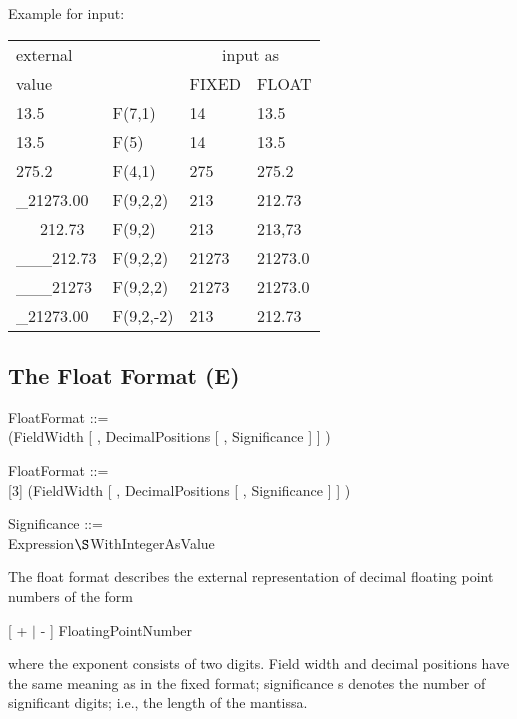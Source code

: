 \begin{added}
Example for input:

\begin{tabular}{llll}
external       &          & \multicolumn{2}{c}{input as}  \\ 
value       &          & FIXED & FLOAT  \\ \hline
13.5   & F(7,1)   &  14 & 13.5   \\
13.5   & F(5)     &  14 & 13.5   \\
275.2  & F(4,1)   & 275 & 275.2 \\
\_21273.00 & F(9,2,2) & 213 & 212.73 \\
\ \ \ 212.73 &  F(9,2)&  213 & 213,73 \\
\_\_\_212.73 & F(9,2,2) & 21273 & 21273.0 \\
\_\_\_21273 & F(9,2,2) & 21273 & 21273.0 \\
\_21273.00 & F(9,2,-2)   & 213 & 212.73 \\
\end{tabular}

\end{added}

\subsection{The Float Format (E)}   %
\label{sec_dation_e_format}

\begin{removed}
FloatFormat ::=\\
 (FieldWidth [ , DecimalPositions [ , Significance ] ] )
\end{removed}
\begin{added}
FloatFormat ::=\\
[3] (FieldWidth [ , DecimalPositions [ , Significance ] ] )
\end{added}

Significance ::= \\
\x Expression$\S $WithIntegerAsValue

The float format describes the external representation of decimal
floating point numbers of the form

[ + $\mid$ - ] FloatingPointNumber

where the exponent consists of two  digits.
 Field width and decimal
positions have the same meaning as in the fixed format; significance s
denotes the number of significant digits; i.e., the length of the
mantissa.

